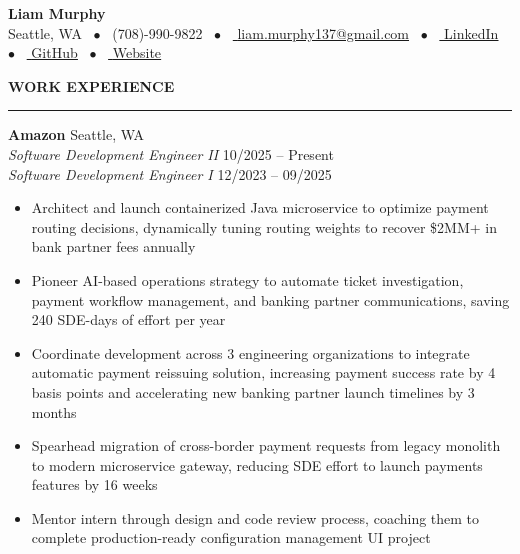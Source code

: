 \documentclass[10pt]{article}
\newcommand{\link}[2]{\href{#2}{\color{darkgray} \uline{#1}}}
\newcommand{\heading}[1]{{\Large \bfseries \color{primary} #1}}
\begin{document}
\begin{center}
    {\Huge \bfseries \color{primary} Liam Murphy} \\ \vspace{4pt}
    \small
    Seattle, WA \ $\bullet$ \ 
    (708)-990-9822 \ $\bullet$ \ 
    \link{liam.murphy137@gmail.com}{mailto:liam.murphy137@gmail.com} \ $\bullet$ \ 
    \link{LinkedIn}{https://www.linkedin.com/in/liammurphy14/} \ $\bullet$ \ 
    \link{GitHub}{https://github.com/liam-murphy14} \ $\bullet$ \ 
    \link{Website}{https://liammurphydev.com}
\end{center}

\vspace{12pt}

\heading{WORK EXPERIENCE}
\vspace{4pt}
\hrule
\vspace{6pt}

{\bfseries Amazon} \hfill Seattle, WA \\
{\itshape Software Development Engineer II} \hfill 10/2025 -- Present \\
{\itshape Software Development Engineer I} \hfill 12/2023 -- 09/2025
\begin{itemize}
    \item Architect and launch containerized Java microservice to optimize payment routing decisions, dynamically tuning routing weights to recover \$2MM+ in bank partner fees annually
    \item Pioneer AI-based operations strategy to automate ticket investigation, payment workflow management, and banking partner communications, saving 240 SDE-days of effort per year
    \item Coordinate development across 3 engineering organizations to integrate automatic payment reissuing solution, increasing payment success rate by 4 basis points and accelerating new banking partner launch timelines by 3 months
    \item Spearhead migration of cross-border payment requests from legacy monolith to modern microservice gateway, reducing SDE effort to launch payments features by 16 weeks
    \item Mentor intern through design and code review process, coaching them to complete production-ready configuration management UI project
\end{itemize}

\vspace{6pt}
\end{document}
